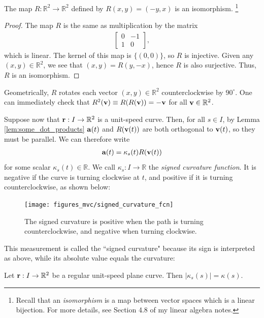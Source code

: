 \documentclass[12pt,letterpaper,reqno]{article}
\numberwithin{equation}{section}
\newcommand{\R}{\ensuremath{\mathbb R}}
\newcommand{\bv}{{\bf v}}
\newcommand{\ba}{{\bf a}}
\newcommand{\bbr}{{\bf r}}
\begin{document}
{\begin{prop}
The map $R: \R^2 \to \R^2$ defined by $R(x,y)=(-y,x)$ is an isomorphism. \footnote{Recall that an \emph{isomorphism} is a map between vector spaces which is a linear bijection. For more details, see Section 4.8 of my linear algebra notes.}
\end{prop}

\begin{proof}
	The map $R$ is the same as multiplication by the matrix 
	\begin{align*}
		\begin{bmatrix}
			0 & -1 \\
			1 & 0
		\end{bmatrix},
	\end{align*}
	which is linear. The kernel of this map is $\{(0,0)\}$, so $R$ is injective. Given any $(x,y) \in \R^2$, we see that $(x,y)=R(y,-x)$, hence $R$ is also surjective. Thus, $R$ is an isomorphism. 
\end{proof}
Geometrically, $R$ rotates each vector $(x,y) \in \R^2$ counterclockwise by $90^\circ$. One can immediately check that $R^2(\bv)\equiv R(R(\bv))=-\bv$ for all $\bv \in \R^2$.

Suppose now that $\bbr:I \to \R^2$ is a unit-speed curve. Then, for all $s \in I$, by Lemma \ref{lem:some_dot_products} $\ba(t)$ and $R(\bv(t))$ are both orthogonal to $\bv(t)$, so they must be parallel. We can therefore write
\begin{align}\label{eq:acc_signed_curvature}
	\ba(t)=\kappa_s(t) R(\bv(t))
\end{align}
for some scalar $\kappa_s(t) \in \R$. We call $\kappa_s:I \to \R$ the \emph{signed curvature function}. It is negative if the curve is turning clockwise at $t$, and positive if it is turning counterclockwise, as shown below:

\newpage

\begin{figure}[h]
	\begin{center}
		\texttt{[image: figures\_mvc/signed\_curvature\_fcn]}
	\end{center}
	\caption{The signed curvature is positive when the path is turning counterclockwise, and negative when turning clockwise.}
\end{figure}
This measurement is called the ``signed curvature" because its sign is interpreted as above, while its absolute value equals the curvature:

\begin{prop}
Let $\bbr:I \to \R^2$ be a regular unit-speed plane curve. Then $|\kappa_s(s)|=\kappa(s)$.	
\end{prop}

}
\end{document}
